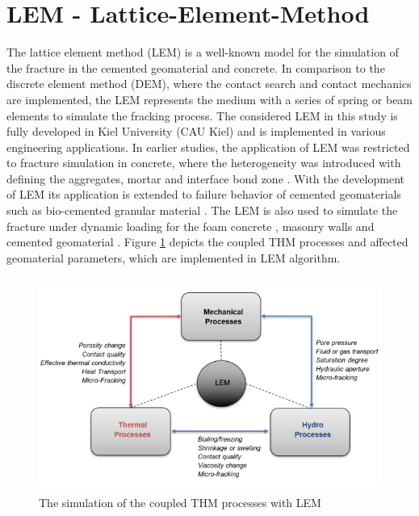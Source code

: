 \section{LEM - Lattice-Element-Method}
The lattice element method (LEM) is a well-known model for the simulation of the fracture in the cemented geomaterial and concrete. In comparison to the discrete element method (DEM), where the contact search and contact mechanics are implemented, the LEM represents the medium with a series of spring or beam elements to simulate the fracking process. The considered LEM in this study is fully developed in Kiel University (CAU Kiel) and is implemented in various engineering applications. In earlier studies, the application of LEM was restricted to fracture simulation in concrete, where the heterogeneity was introduced with defining the aggregates, mortar and interface bond zone \cite{Liuetal2007, Pradoetal2003, vanMieretal2002}. With the development of LEM its application is extended to failure behavior of cemented geomaterials such as bio-cemented granular material \cite{Rizvietal2019a}. The LEM is also used to simulate the fracture under dynamic loading for the foam concrete \cite{Rizvietal2018a}, masonry walls \cite{Sattarietal2019a} and cemented geomaterial \cite{ Rizvietal2018c, Rizvietal2020a}. Figure \ref{fig:Amir_LEM_Code} depicts the coupled THM processes and affected geomaterial parameters, which are implemented in LEM algorithm.

\begin{figure}[!ht]
\centering
\includegraphics[width=12cm,height=7cm]{figures/Amir_LEM_Code.png}
\caption{The simulation of the coupled THM processes with LEM}
\label{fig:Amir_LEM_Code}
\end{figure} 

